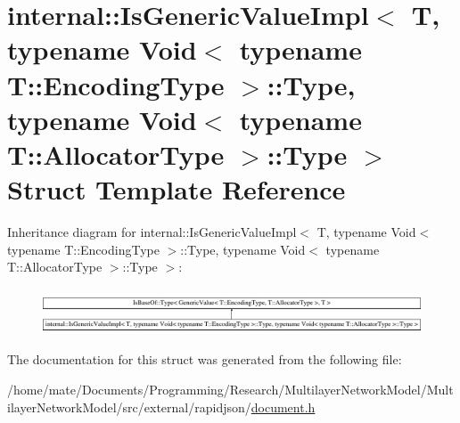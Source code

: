 \hypertarget{structinternal_1_1IsGenericValueImpl_3_01T_00_01typename_01Void_3_01typename_01T_1_1EncodingType794abcc01fcce01e300668fa57e4d036}{}\section{internal\+:\+:Is\+Generic\+Value\+Impl$<$ T, typename Void$<$ typename T\+:\+:Encoding\+Type $>$\+:\+:Type, typename Void$<$ typename T\+:\+:Allocator\+Type $>$\+:\+:Type $>$ Struct Template Reference}
\label{structinternal_1_1IsGenericValueImpl_3_01T_00_01typename_01Void_3_01typename_01T_1_1EncodingType794abcc01fcce01e300668fa57e4d036}
Inheritance diagram for internal\+:\+:Is\+Generic\+Value\+Impl$<$ T, typename Void$<$ typename T\+:\+:Encoding\+Type $>$\+:\+:Type, typename Void$<$ typename T\+:\+:Allocator\+Type $>$\+:\+:Type $>$\+:\begin{figure}[H]
\begin{center}
\leavevmode
\includegraphics[height=1.372549cm]{structinternal_1_1IsGenericValueImpl_3_01T_00_01typename_01Void_3_01typename_01T_1_1EncodingType794abcc01fcce01e300668fa57e4d036}
\end{center}
\end{figure}


The documentation for this struct was generated from the following file\+:\begin{DoxyCompactItemize}
\item 
/home/mate/\+Documents/\+Programming/\+Research/\+Multilayer\+Network\+Model/\+Multilayer\+Network\+Model/src/external/rapidjson/\hyperlink{document_8h}{document.\+h}\end{DoxyCompactItemize}
